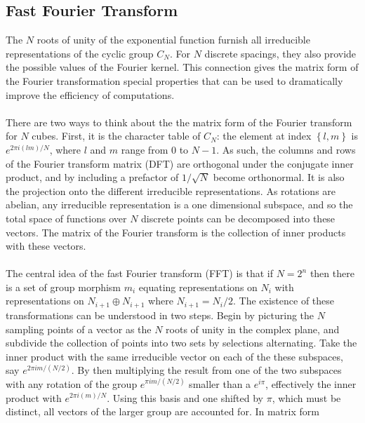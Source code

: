 \documentclass[reprint,aps,prb]{revtex4-2}
\begin{document}



\subsection{Fast Fourier Transform}
\noindent 
The $N$ roots of unity of the exponential function furnish all irreducible representations of the cyclic group $C_{N}$. For $N$ discrete spacings, they also provide the possible values of the Fourier kernel. This connection gives the matrix form of the Fourier transformation special properties that can be used to dramatically improve the efficiency of computations.\\ \\
There are two ways to think about the the matrix form of the Fourier transform for $N$ cubes. First, it is the character table of $C_{N}$: the element at index $\left\{l,m\right\}$ is $e^{2\pi i \left(lm\right)/N}$, where $l$ and $m$ range from $0$ to $N-1$. As such, the columns and rows of the Fourier transform matrix (DFT) are orthogonal under the conjugate inner product, and by including a prefactor of $1/\sqrt{N}$ become orthonormal. It is also the projection onto the different irreducible representations. As rotations are abelian, any irreducible representation is a one dimensional subspace, and so the total space of functions over $N$ discrete points can be decomposed into these vectors. The matrix of the Fourier transform is the collection of inner products with these vectors.\\ \\
The central idea of the fast Fourier transform (FFT) is that if $N=2^{n}$ then there is a set of group morphism $m_{i}$ equating representations on $N_{i}$ with representations on $N_{i+1}\oplus N_{i+1}$ where $N_{i+1}=N_{i}/2$. The existence of these transformations can be understood in two steps. Begin by picturing the $N$ sampling points of a vector as the $N$ roots of unity in the complex plane, and subdivide the collection of points into two sets by selections alternating. Take the inner product with the same irreducible vector on each of the these subspaces, say $e^{2 \pi i m/(N/2)}$. By then multiplying the result from one of the two subspaces with any rotation of the group $e^{\pi i m/(N/2)}$ smaller than a $e^{i\pi}$, effectively the inner product with  $e^{2\pi i\left(m\right)/N}$. Using this basis and one shifted by $\pi$, which must be distinct, all vectors of the larger group are accounted for. In matrix form 
\end{document}
